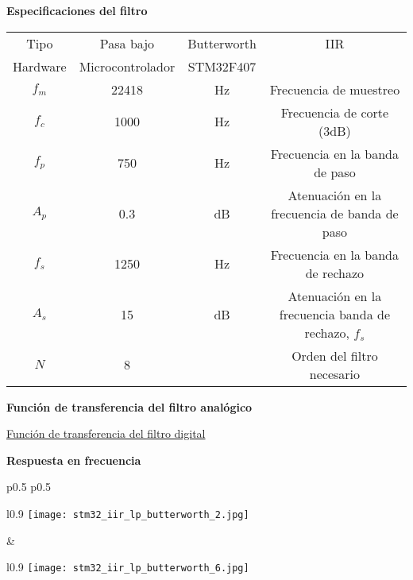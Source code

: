 \documentclass[informe.tex]{subfiles}
\begin{document}
\textbf{Especificaciones del filtro}	\newline	
								
	\begin{tabular}{ |c | c| c| c|}
		\hline
			 Tipo     & Pasa bajo & Butterworth & IIR \\
 			 Hardware & Microcontrolador & STM32F407 & \\
			$ f_m $  & 22418  & Hz & Frecuencia de muestreo \\
			$ f_c $  & 1000   & Hz & Frecuencia de corte (3dB) \\
			$ f_p $  & 750    & Hz & Frecuencia en la banda de paso\\
			$ A_p $  & 0.3    & dB & Atenuación en la frecuencia de banda de paso \\			
			$ f_s $  & 1250   & Hz & Frecuencia en la banda de rechazo \\
			$ A_s $  & 15     & dB & Atenuación en la frecuencia banda de rechazo, $f_s$ \\
			$ N $   & 8      &  & Orden del filtro necesario \\				
		\hline
	\end{tabular}\newline\newline		
	
\textbf{Función de transferencia del filtro analógico}\newline
	\begin{tiny}
		
	\end{tiny}\newline
    	
    	\underline{Función de transferencia del filtro digital}\newline
	\begin{tiny}
		
	\end{tiny}\newline
	
\textbf{Respuesta en frecuencia}\newline

	\begin{tabular}{p{0.5\textwidth} p{0.5\textwidth}}		
		\begin{wrapfigure}{l}{0.9\linewidth}
    		\centering
    		\texttt{[image: stm32\_iir\_lp\_butterworth\_2.jpg]}
    		\caption{Filtro analógico}
		\end{wrapfigure}					
		&	
	 	\begin{wrapfigure}{l}{0.9\linewidth}
    		\centering
    		\texttt{[image: stm32\_iir\_lp\_butterworth\_6.jpg]}
    		\caption{Filtro digital}
		\end{wrapfigure}			
	 	\\ 
	\end{tabular}\newpage
	
\end{document}
